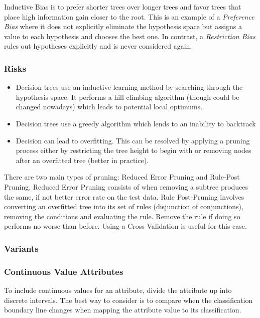 \documentclass[titlepage,11pt]{article}
\begin{document}
Inductive Bias is to prefer shorter trees over longer trees and favor trees that place high information gain closer to the root. This is an example of a \textit{Preference Bias} where it does not explicitly eliminate the hypothesis space but assigns a value to each hypothesis and chooses the best one. In contrast, a \textit{Restriction Bias} rules out hypotheses explicitly and is never considered again.

\subsubsection{Risks}

\begin{itemize}
\item Decision trees use an inductive learning method by searching through the hypothesis space. It performs a hill climbing algorithm (though could be changed nowadays) which leads to potential local optimums.
\item Decision trees use a greedy algorithm which lends to an inability to backtrack
\item Decision can lead to overfitting. This can be resolved by applying a pruning process either by restricting the tree height to begin with or removing nodes after an overfitted tree (better in practice).
\end{itemize}

There are two main types of pruning: Reduced Error Pruning and Rule-Post Pruning. Reduced Error Pruning consists of when removing a subtree produces the same, if not better error rate on the test data. Rule Post-Pruning involves converting an overfitted tree into its set of rules (disjunction of conjunctions), removing the conditions and evaluating the rule. Remove the rule if doing so performs no worse than before. Using a Cross-Validation is useful for this case.

\subsubsection{Variants}

\subsubsection*{Continuous Value Attributes}

To include continuous values for an attribute, divide the attribute up into discrete intervals. The best way to consider is to compare when the classification boundary line changes when mapping the attribute value to its classification.
\end{document}
